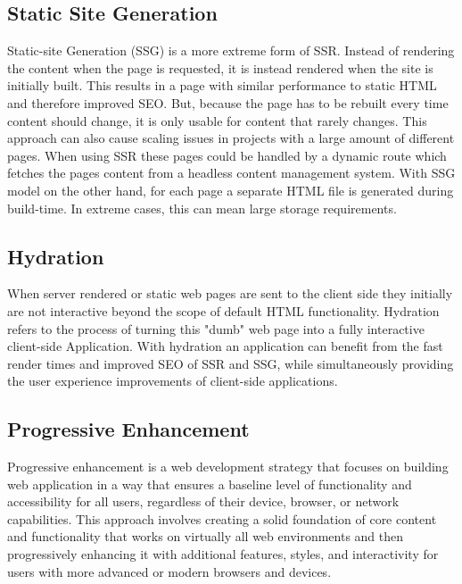 \subsection{Static Site Generation}
Static-site Generation (SSG) is a more extreme form of SSR. Instead of rendering the content when the page is requested, it is instead rendered when the site is initially built. This results in a page with similar performance to static HTML and therefore improved SEO. But, because the page has to be rebuilt every time content should change, it is only usable for content that rarely changes. This approach can also cause scaling issues in projects with a large amount of different pages. When using SSR these pages could be handled by a dynamic route which fetches the pages content from a headless content management system. With SSG model on the other hand, for each page a separate HTML file is generated during build-time. In extreme cases, this can mean large storage requirements. 

\subsection{Hydration}
When server rendered or static web pages are sent to the client side they initially are not interactive beyond the scope of default HTML functionality. Hydration refers to the process of turning this "dumb" web page into a fully interactive client-side Application. With hydration an application can benefit from the fast render times and improved SEO of SSR and SSG, while simultaneously providing the user experience improvements of client-side applications.

\subsection{Progressive Enhancement}
Progressive enhancement is a web development strategy that focuses on building web application in a way that ensures a baseline level of functionality and accessibility for all users, regardless of their device, browser, or network capabilities. This approach involves creating a solid foundation of core content and functionality that works on virtually all web environments and then progressively enhancing it with additional features, styles, and interactivity for users with more advanced or modern browsers and devices.

